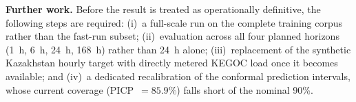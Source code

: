 \textbf{Further work.} Before the result is treated as operationally definitive, the following steps are required: (i)~a full-scale run on the complete training corpus rather than the fast-run subset; (ii)~evaluation across all four planned horizons (1~h, 6~h, 24~h, 168~h) rather than 24~h alone; (iii)~replacement of the synthetic Kazakhstan hourly target with directly metered KEGOC load once it becomes available; and (iv)~a dedicated recalibration of the conformal prediction intervals, whose current coverage (PICP~$=85.9\%$) falls short of the nominal 90\%.
